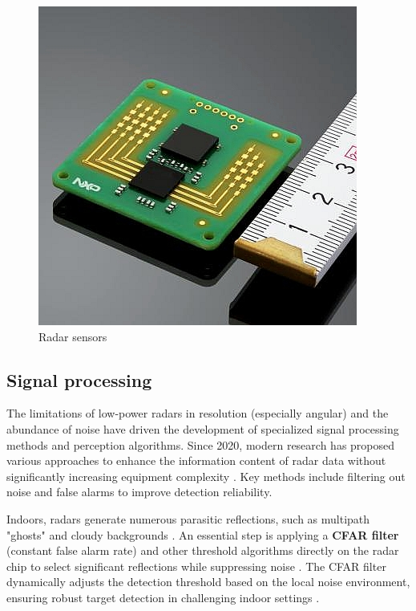 \begin{figure}[H]
    \centering
    \includegraphics[width=\linewidth/2]{Src/images/automotive-radars.jpg} 
    \caption{Radar sensors \citep{ti_mmwave_overview}}
    \label{fig:radarsensor}
\end{figure}


\subsection{Signal processing}
The limitations of low-power radars in resolution (especially angular) and the abundance of noise have driven the development of specialized signal processing methods and perception algorithms. Since 2020, modern research has proposed various approaches to enhance the information content of radar data without significantly increasing equipment complexity \citep{Richards2010}. Key methods include filtering out noise and false alarms to improve detection reliability.

Indoors, radars generate numerous parasitic reflections, such as multipath "ghosts" and cloudy backgrounds \citep{Skolnik2001}. An essential step is applying a \textbf{CFAR filter} (constant false alarm rate) and other threshold algorithms directly on the radar chip to select significant reflections while suppressing noise \citep{Richards2010, Rohling1983}. The CFAR filter dynamically adjusts the detection threshold based on the local noise environment, ensuring robust target detection in challenging indoor settings \citep{Finn1986}.


